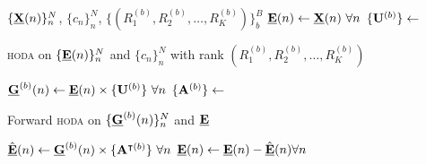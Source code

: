 \begin{algorithmic}[1]
	\Require $\{\underline{\mathbf{X}}(n)\}_n^N$, $\{c_n\}_n^N$,
	$\{(R_1^{(b)},R_2^{(b)},\ldots,R_K^{(b)})\}_b^B$
	\State $\underline{\mathbf{E}}(n)\gets\underline{\mathbf{X}}(n)\ \forall n$
	\State $\{\mathbf{U}^{(b)}\}\gets$ \parbox[t]{5cm}{\textsc{hoda} on $\{\underline{\mathbf{E}}(n)\}_n^N$ and
	$\{c_n\}_n^N$ with rank $(R_1^{(b)},R_2^{(b)},\ldots,R_K^{(b)})$}
	\State $\underline{\mathbf{G}}^{(b)}(n)\gets\underline{\mathbf{E}}(n)\times\{\mathbf{U}^{(b)}\}\
		\forall n$
	\State $\{\mathbf{A}^{(b)}\}\gets$ \parbox[t]{5cm}{Forward \textsc{hoda} on
		$\{\underline{\mathbf{G}}^{(b)}(n)\}_n^N$ and $\underline{\mathbf{E}}$}
	\State
	$\hat{\underline{\mathbf{E}}}(n)\gets\underline{\mathbf{G}}^{(b)}(n)\times\{\mathbf{A}^{\intercal(b)}\}\
		\forall n$
	\State
	$\underline{\mathbf{E}}(n)\gets \underline{\mathbf{E}}(n) - \hat{\underline{\mathbf{E}}}(n) \forall n$

	\EndFor
\end{algorithmic}
